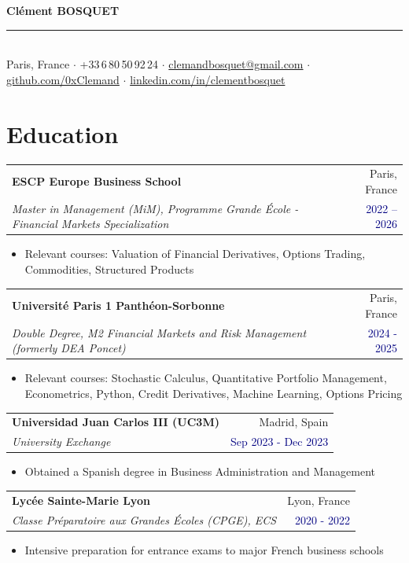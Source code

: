 \documentclass[11pt, a4paper]{article}
\makeatletter
\newcommand{\cventry}[4]{%
  \begin{tabularx}{\textwidth}{@{} X r @{}}
    \textbf{#1} & {\small\textcolor{muted}{#3}} \\[-3pt]
    \textit{\small #2} & {\small\textcolor{navy}{#4}}
  \end{tabularx}\vspace{-1pt}%
}
\makeatother
\begin{document}
{\fontsize{21}{25}\selectfont\bfseries Clément BOSQUET}\\[6pt]
{\color{navy}\rule{\linewidth}{0.9pt}}\\[5pt]
{\small\textcolor{muted}{%
  Paris, France
  \enspace$\cdot$\enspace
  +33\,6\,80\,50\,92\,24
  \enspace$\cdot$\enspace
  \href{mailto:clemandbosquet@gmail.com}{clemandbosquet@gmail.com}%
  \enspace$\cdot$\enspace
  \href{https://github.com/0xClemand}{github.com/0xClemand}%
  \enspace$\cdot$\enspace
  \href{https://www.linkedin.com/in/clementbosquet}{linkedin.com/in/clementbosquet}%
}}

\section{Education}

\cventry{ESCP Europe Business School}
        {Master in Management (MiM), Programme Grande École - Financial Markets Specialization}
        {Paris, France}{2022 – 2026}
\begin{itemize}
  \item Relevant courses: Valuation of Financial Derivatives, Options Trading, Commodities,
        Structured Products
\end{itemize}

\smallskip
\cventry{Université Paris 1 Panthéon-Sorbonne}
        {Double Degree, M2 Financial Markets and Risk Management (formerly DEA Poncet)}
        {Paris, France}{2024 - 2025}
\begin{itemize}
  \item Relevant courses: Stochastic Calculus, Quantitative Portfolio Management, Econometrics,
        Python, Credit Derivatives, Machine Learning, Options Pricing
\end{itemize}

\smallskip
\cventry{Universidad Juan Carlos III (UC3M)}
        {University Exchange}
        {Madrid, Spain}{Sep 2023 - Dec 2023}
\begin{itemize}
  \item Obtained a Spanish degree in Business Administration and Management
\end{itemize}

\smallskip
\cventry{Lycée Sainte-Marie Lyon}
        {Classe Préparatoire aux Grandes Écoles (CPGE), ECS}
        {Lyon, France}{2020 - 2022}
\begin{itemize}
  \item Intensive preparation for entrance exams to major French business schools
\end{itemize}
\end{document}

